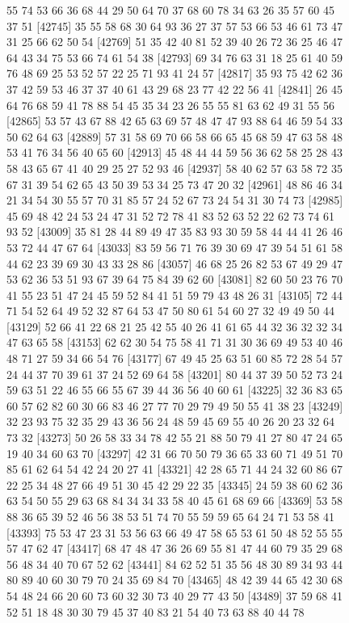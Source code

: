 \documentclass{article}
\begin{document}
\begin{figure}[H]
\begin{Schunk}
\begin{Soutput}
[42721] 55 74 53 66 36 68 44 29 50 64 70 37 68 60 78 34 63 26 35 57 60 45 37 51
[42745] 35 55 58 68 30 64 93 36 27 37 57 53 66 53 46 61 73 47 31 25 66 62 50 54
[42769] 51 35 42 40 81 52 39 40 26 72 36 25 46 47 64 43 34 75 53 66 74 61 54 38
[42793] 69 34 76 63 31 18 25 61 40 59 76 48 69 25 53 52 57 22 25 71 93 41 24 57
[42817] 35 93 75 42 62 36 37 42 59 53 46 37 37 40 61 43 29 68 23 77 42 22 56 41
[42841] 26 45 64 76 68 59 41 78 88 54 45 35 34 23 26 55 55 81 63 62 49 31 55 56
[42865] 53 57 43 67 88 42 65 63 69 57 48 47 47 93 88 64 46 59 54 33 50 62 64 63
[42889] 57 31 58 69 70 66 58 66 65 45 68 59 47 63 58 48 53 41 76 34 56 40 65 60
[42913] 45 48 44 44 59 56 36 62 58 25 28 43 58 43 65 67 41 40 29 25 27 52 93 46
[42937] 58 40 62 57 63 58 72 35 67 31 39 54 62 65 43 50 39 53 34 25 73 47 20 32
[42961] 48 86 46 34 21 34 54 30 55 57 70 31 85 57 24 52 67 73 24 54 31 30 74 73
[42985] 45 69 48 42 24 53 24 47 31 52 72 78 41 83 52 63 52 22 62 73 74 61 93 52
[43009] 35 81 28 44 89 49 47 35 83 93 30 59 58 44 44 41 26 46 53 72 44 47 67 64
[43033] 83 59 56 71 76 39 30 69 47 39 54 51 61 58 44 62 23 39 69 30 43 33 28 86
[43057] 46 68 25 26 82 53 67 49 29 47 53 62 36 53 51 93 67 39 64 75 84 39 62 60
[43081] 82 60 50 23 76 70 41 55 23 51 47 24 45 59 52 84 41 51 59 79 43 48 26 31
[43105] 72 44 71 54 52 64 49 52 32 87 64 53 47 50 80 61 54 60 27 32 49 49 50 44
[43129] 52 66 41 22 68 21 25 42 55 40 26 41 61 65 44 32 36 32 32 34 47 63 65 58
[43153] 62 62 30 54 75 58 41 71 31 30 36 69 49 53 40 46 48 71 27 59 34 66 54 76
[43177] 67 49 45 25 63 51 60 85 72 28 54 57 24 44 37 70 39 61 37 24 52 69 64 58
[43201] 80 44 37 39 50 52 73 24 59 63 51 22 46 55 66 55 67 39 44 36 56 40 60 61
[43225] 32 36 83 65 60 57 62 82 60 30 66 83 46 27 77 70 29 79 49 50 55 41 38 23
[43249] 32 23 93 75 32 35 29 43 36 56 24 48 59 45 69 55 40 26 20 23 32 64 73 32
[43273] 50 26 58 33 34 78 42 55 21 88 50 79 41 27 80 47 24 65 19 40 34 60 63 70
[43297] 42 31 66 70 50 79 36 65 33 60 71 49 51 70 85 61 62 64 54 42 24 20 27 41
[43321] 42 28 65 71 44 24 32 60 86 67 22 25 34 48 27 66 49 51 30 45 42 29 22 35
[43345] 24 59 38 60 62 36 63 54 50 55 29 63 68 84 34 34 33 58 40 45 61 68 69 66
[43369] 53 58 88 36 65 39 52 46 56 38 53 51 74 70 55 59 59 65 64 24 71 53 58 41
[43393] 75 53 47 23 31 53 56 63 66 49 47 58 65 53 61 50 48 52 55 55 57 47 62 47
[43417] 68 47 48 47 36 26 69 55 81 47 44 60 79 35 29 68 56 48 34 40 70 67 52 62
[43441] 84 62 52 51 35 56 48 30 89 34 93 44 80 89 40 60 30 79 70 24 35 69 84 70
[43465] 48 42 39 44 65 42 30 68 54 48 24 66 20 60 73 60 32 30 73 40 29 77 43 50
[43489] 37 59 68 41 52 51 18 48 30 30 79 45 37 40 83 21 54 40 73 63 88 40 44 78

\end{Soutput}
\end{Schunk}
\end{figure}
\end{document}
